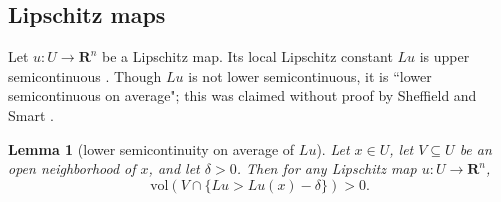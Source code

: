 \documentclass[reqno,11pt]{amsart}
\newcommand{\RR}{\mathbf{R}}
\newcommand{\vol}{\mathrm{vol}}
\newtheorem{lemma}[theorem]{Lemma}
\theoremstyle{definition}
\numberwithin{equation}{section}
\begin{document}
\subsection{Lipschitz maps}
Let $u: U \to \RR^n$ be a Lipschitz map.
Its local Lipschitz constant $Lu$ is upper semicontinuous \cite[Lemma 4.2(a)]{Crandall2008}.
Though $Lu$ is not lower semicontinuous, it is ``lower semicontinuous on average"; this was claimed without proof by Sheffield and Smart \cite[\S1.4]{Sheffield12}.

\begin{lemma}[lower semicontinuity on average of $Lu$]\label{partial lower semicontinuity}
Let $x \in U$, let $V \subseteq U$ be an open neighborhood of $x$, and let $\delta > 0$.
Then for any Lipschitz map $u: U \to \RR^n$,
$$\vol(V \cap \{Lu > Lu(x) - \delta\}) > 0.$$
\end{lemma}
\end{document}
